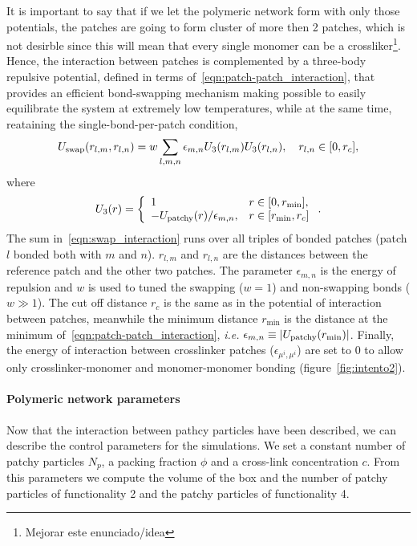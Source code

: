 It is important to say that if we let the polymeric network form with only those potentials, the patches are going to form cluster of more then 2 patches, which is not desirble since this will mean that every single monomer can be a crossliker\footnote{Mejorar este enunciado/idea}.
Hence, the interaction between patches is complemented by a three-body repulsive potential, defined in terms of~\eqref{eqn:patch-patch_interaction}, that provides an efficient bond-swapping mechanism making possible to easily equilibrate the system at extremely low temperatures, while at the same time, reataining the single-bond-per-patch condition\citep{sciortinoThreebodyPotentialSimulating2017},
\begin{gather}
    U_{\mathrm{swap}}(r_{l,m},r_{l,n}) = w\sum_{l,m,n}\epsilon_{m,n}U_3\qty(r_{l,m})U_3\qty(r_{l,n}),\quad r_{l,n}\in\qty[0,r_c],\label{eqn:swap_interaction}
\end{gather}
where
\begin{gather}
    U_{3}\qty(r) = \left\{
        \begin{array}{ll}
            1 & r\in\qty[0,r_{\min}], \\
            -U_{\mathrm{patchy}}\qty(r)/\epsilon_{m,n}, & r\in\qty[r_{\min},r_c]
        \end{array}
        \right.\label{eqn:swapmod_interaction}.
\end{gather}
The sum in~\eqref{eqn:swap_interaction} runs over all triples of bonded patches (patch $l$ bonded both with $m$ and $n$).
$r_{l,m}$ and $r_{l,n}$ are the distances between the reference patch and the other two patches.
The parameter $\epsilon_{m,n}$ is the energy of repulsion and $w$ is used to tuned the swapping ($w=1$) and non-swapping bonds ($w\gg1$). 
The cut off distance $r_c$ is the same as in the potential of interaction between patches, meanwhile the minimum distance $r_{\min}$ is the distance at the minimum of~\eqref{eqn:patch-patch_interaction}, \textit{i.e.} $\epsilon_{m,n}\equiv\abs{U_{\mathrm{patchy}}(r_{\min})}$.
Finally, the energy of interaction between crosslinker patches ($\epsilon_{\mu^i,\mu^i}$) are set to $0$ to allow only crosslinker-monomer and monomer-monomer bonding (figure~\ref{fig:intento2}).

\paragraph{Polymeric network parameters}
Now that the interaction between pathcy particles have been described, we can describe the control parameters for the simulations.
We set a constant number of patchy particles $N_p$, a packing fraction $\phi$ and a cross-link concentration $c$. 
From this parameters we compute the volume of the box and the number of patchy particles of functionality 2 and the patchy particles of functionality 4.

